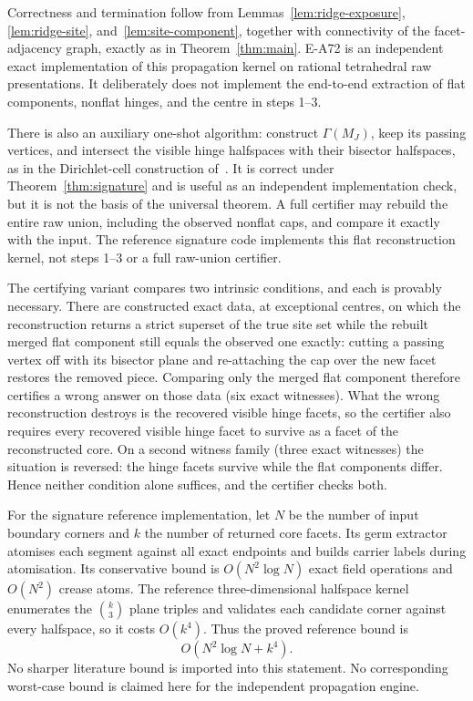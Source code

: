 \documentclass[11pt]{amsart}
\theoremstyle{definition}
\newcommand{\GammaM}{\Gamma(M_J)}
\begin{document}
Correctness and termination follow from Lemmas~\ref{lem:ridge-exposure},
\ref{lem:ridge-site}, and~\ref{lem:site-component}, together with connectivity
of the facet-adjacency graph, exactly as in Theorem~\ref{thm:main}.  E-A72 is
an independent exact implementation of this propagation kernel on rational
tetrahedral raw presentations.  It deliberately does not implement the
end-to-end extraction of flat components, nonflat hinges, and the centre in
steps 1--3.

There is also an auxiliary one-shot algorithm: construct $\GammaM$, keep its
passing vertices, and intersect the visible hinge halfspaces with their
bisector halfspaces, as in the Dirichlet-cell construction
of~\cite{AshBolker1985}.  It is correct under Theorem~\ref{thm:signature} and
is useful as an independent implementation check, but it is not the basis of
the universal theorem.  A full certifier may rebuild the entire raw union,
including the observed nonflat caps, and compare it exactly with the input.
The reference signature code implements this flat reconstruction kernel, not
steps 1--3 or a full raw-union certifier.

The certifying variant compares two intrinsic conditions, and each is provably
necessary.  There are constructed exact data, at exceptional centres, on
which the reconstruction returns a strict superset of the true site set while
the rebuilt merged flat component still equals the observed one exactly:
cutting a passing vertex off with its bisector plane and re-attaching the cap
over the new facet restores the removed piece.  Comparing only the merged flat
component therefore certifies a wrong answer on those data (six exact
witnesses).  What the wrong reconstruction destroys is the recovered visible
hinge facets, so the certifier also requires every recovered visible hinge
facet to survive as a facet of the reconstructed core.  On a second witness
family (three exact witnesses) the situation is reversed: the hinge facets
survive while the flat components differ.  Hence neither condition alone
suffices, and the certifier checks both.

For the signature reference implementation, let $N$ be the number of input
boundary corners and $k$ the number of returned core facets.  Its germ
extractor atomises each segment against all
exact endpoints and builds carrier labels during atomisation.  Its conservative
bound is $O(N^2\log N)$ exact field operations and $O(N^2)$ crease atoms.  The
reference three-dimensional halfspace kernel enumerates the $\binom k3$ plane
triples and validates each candidate corner against every halfspace, so it
costs $O(k^4)$.  Thus the proved reference bound is
\[
 O(N^2\log N+k^4).
\]
No sharper literature bound is imported into this statement.
No corresponding worst-case bound is claimed here for the independent
propagation engine.
\end{document}

